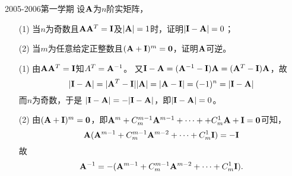 \begin{frame}
\begin{footnotesize}
\begin{exampleblock}{2005-2006第一学期}
设$\A$为$n$阶实矩阵，
\begin{itemize}
\item[(1)] 当$n$为奇数且$\A\A^T=\II$及$|\A|=1$时，证明$|\II-\A|=0$；
\item[(2)]  当$m$为任意给定正整数且$(\A+\II)^m=\zero$，证明$\A$可逆。
\end{itemize}
\end{exampleblock}
\pause\proofname
\begin{itemize}
\item[(1)]
由$\A\A^T=\II$知$A^T=\A^{-1}$。
又$\II-\A=(\A^{-1}-\II)\A=(\A^T-\II)\A$，故
$$
|\II-\A|=|\A^T-\II||\A|=|\A-\II|=(-1)^n=|\II-\A|
$$
而$n$为奇数，于是
$
|\II-\A|=-|\II-\A|
$，即$|\II-\A|=0$。\\[0.1in] \pause 
\item[(2)]
由$(\A+\II)^m=\zero$，即$\A^m+C_m^{m-1}\A^{m-1}+\cd++C_m^{1}\A+\II=\zero$可知，
$$
\A(\A^{m-1}+C_m^{m-1}\A^{m-2}+\cd+C_m^{1}\II)=-\II
$$
故
$$
\A^{-1}=-(\A^{m-1}+C_m^{m-1}\A^{m-2}+\cd+C_m^{1}\II).
$$
\end{itemize}
\end{footnotesize}
\end{frame}


